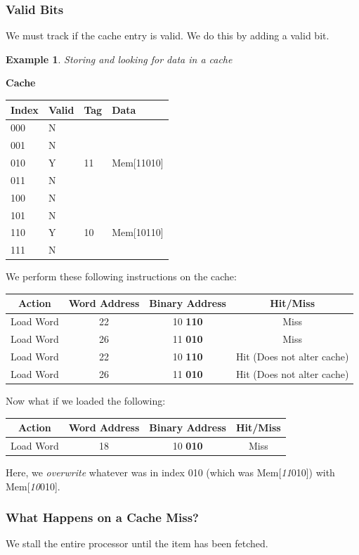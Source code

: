 \documentclass{report}
\newtheorem{ex}{Example}[section]
\begin{document}
\subsubsection{Valid Bits}
We must track if the cache entry is valid. We do this by adding a valid bit.
\begin{ex}
Storing and looking for data in a cache
\end{ex}
\begin{center}
\textbf{Cache}\\
\begin{tabular}{ l | l | l | l }
\hline
Index & Valid & Tag & Data \\\hline
000 & N & & \\
001 & N & & \\
010 & Y & 11 & Mem[11010] \\
011 & N & & \\
100 & N & & \\
101 & N & & \\
110 & Y & 10 & Mem[10110] \\
111 & N & & \\
\end{tabular}
\end{center}
We perform these following instructions on the cache:
\begin{center}
\begin{tabular}{ c | c | c | c }
\hline Action & Word Address & Binary Address & Hit/Miss \\\hline
Load Word & 22 & 10 \textbf{110} & Miss \\
Load Word & 26 & 11 \textbf{010} & Miss \\
Load Word & 22 & 10 \textbf{110} & Hit (Does not alter cache) \\
Load Word & 26 & 11 \textbf{010} & Hit (Does not alter cache)\\
\end{tabular}
\end{center}
Now what if we loaded the following:
\begin{center}
\begin{tabular}{ c | c | c | c }
\hline Action & Word Address & Binary Address & Hit/Miss \\\hline
Load Word & 18 & 10 \textbf{010} & Miss \\
\end{tabular}
\end{center}
Here, we \textit{overwrite} whatever was in index 010 (which was Mem[\textit{11}010]) with Mem[\textit{10}010].
\subsubsection{What Happens on a Cache Miss?}
We stall the entire processor until the item has been fetched.
\end{document}
